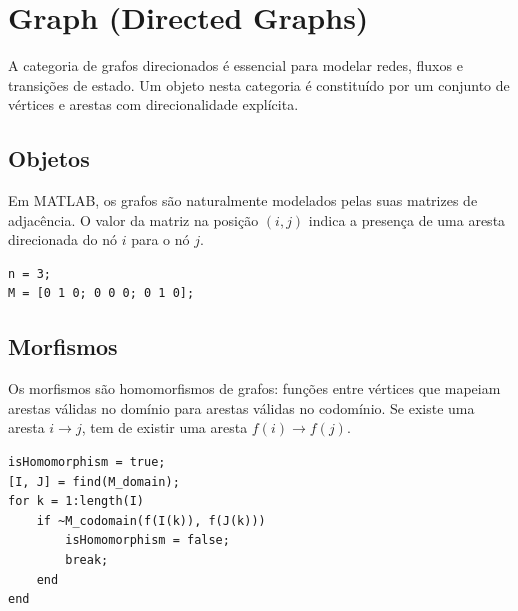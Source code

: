 \section{Graph (Directed Graphs)}
A categoria de grafos direcionados é essencial para modelar redes, fluxos e transições de estado.
Um objeto nesta categoria é constituído por um conjunto de vértices e arestas com direcionalidade explícita.

\subsection{Objetos}
Em MATLAB, os grafos são naturalmente modelados pelas suas matrizes de adjacência.
O valor da matriz na posição $(i,j)$ indica a presença de uma aresta direcionada do nó $i$ para o nó $j$.

\begin{lstlisting}[caption={Representação de um Grafo Direcionado}]
% Matriz de adjacência (Vértices = 3, Arestas = 2)
n = 3;
M = [0 1 0; 0 0 0; 0 1 0];
\end{lstlisting}

\subsection{Morfismos}
Os morfismos são homomorfismos de grafos: funções entre vértices que mapeiam arestas válidas no domínio para arestas válidas no codomínio.
Se existe uma aresta $i \to j$, tem de existir uma aresta $f(i) \to f(j)$.

\begin{lstlisting}[caption={Verificação de Homomorfismo de Grafos}]
% f mapeia vértices do domínio para o codomínio
isHomomorphism = true;
[I, J] = find(M_domain);
for k = 1:length(I)
    if ~M_codomain(f(I(k)), f(J(k)))
        isHomomorphism = false;
        break;
    end
end
\end{lstlisting}